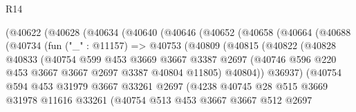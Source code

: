 \begin{lexlean}{R14}
\begin{coremodule}
            (@40622
              (@40628
                (@40634
                  (@40640
                    (@40646
                      (@40652
                        (@40658
                          (@40664
                            (@40688
                              (@40734
                                (fun ("_" : @11157) =>
                                @40753
                                  (@40809
                                    (@40815
                                      (@40822
                                        (@40828
                                          @40833
                                          (@40754
                                            @599
                                            @453
                                            @3669
                                            @3667
                                            @3387
                                            @2697
                                            (@40746
                                              @596
                                              @220
                                              @453
                                              @3667
                                              @3667
                                              @2697
                                              @3387
                                              @40804
                                              @11805)
                                            @40804))
                                        @36937)
                                      (@40754
                                        @594
                                        @453
                                        @31979
                                        @3667
                                        @33261
                                        @2697
                                        (@4238
                                          @40745
                                          @28
                                          @515
                                          @3669
                                          @31978
                                          @11616
                                          @33261
                                          (@40754
                                            @513
                                            @453
                                            @3667
                                            @3667
                                            @512
                                            @2697

\end{coremodule}
\end{lexlean}

